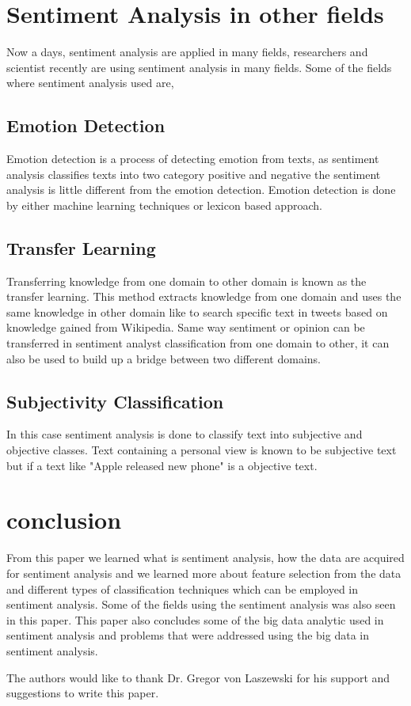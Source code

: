 \documentclass[sigconf]{acmart}
\begin{document}
\section{Sentiment Analysis in other fields}
Now a days, sentiment analysis are applied in many fields, researchers and scientist recently are using sentiment analysis in many fields. Some of the fields where sentiment analysis used are,

\subsection{Emotion Detection}
Emotion detection is a process of detecting emotion from texts, as sentiment analysis classifies texts into two category positive and negative the sentiment analysis is little different from the emotion detection. Emotion detection is done by either machine learning techniques or lexicon based approach.  
\subsection{Transfer Learning}
Transferring knowledge from one domain to other domain is known as the transfer learning. This method extracts knowledge from one domain and uses the same knowledge in other domain like to search specific text in tweets based on knowledge gained from Wikipedia. Same way sentiment or opinion can be transferred in sentiment analyst classification from one domain to other, it can also be used to build up a bridge between two different domains.
\subsection{Subjectivity Classification}
In this case sentiment analysis is done to classify text into subjective and objective classes. Text containing a personal view is known to be subjective text but if a text like "Apple released new phone" is a objective text.

\section{conclusion}

From this paper we learned what is sentiment analysis, how the data are acquired for sentiment analysis and we learned more about feature selection from the data and different types of classification techniques which can be employed in sentiment analysis. Some of the fields using the sentiment analysis was also seen in this paper. This paper also concludes some of the big data analytic used in sentiment analysis and problems that were addressed using the big data in sentiment analysis.
\begin{acks}

  The authors would like to thank Dr. Gregor von Laszewski for his
  support and suggestions to write this paper.

\end{acks}


 



\end{document}

